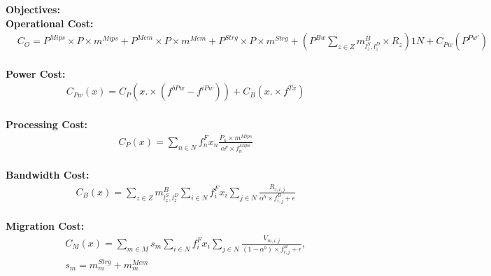 \documentclass{article}
\begin{document}
\pagebreak

\noindent\textbf{Objectives:}\\[12pt]
\noindent\textbf{Operational Cost:}\\[6pt]
\begin{equation*}
\begin{split}
	& C_O = P^{Mips} \times P \times m^{Mips} + P^{Mem} \times P \times m^{Mem} + P^{Strg}\times P\times m^{Strg} + \left(P^{Bw} \sum_{z\in Z} m^B_{l^S_z,l^D_z} \times R_z\right)1N + C_{Pw}(P^{Pw'})
\end{split}
\end{equation*}\\[6pt]

\noindent\textbf{Power Cost:}\\[6pt]
\begin{equation*}
\begin{aligned}
& C_{Pw}(x) = C_P(x.\times(f^{bPw} - f^{iPw})) + C_B(x.\times f^{Tx})
\end{aligned}
\end{equation*}\\[6pt]

\noindent\textbf{Processing Cost:}\\[6pt]
\begin{equation*}
\begin{aligned}
& C_P(x) = \sum_{n\in N} f^{F}_n x_n \frac{P_n \times m^{Mips}}{\alpha^p \times f_n^{Mips}}
\end{aligned}
\end{equation*}\\[6pt]

\noindent\textbf{Bandwidth Cost:}\\[6pt]
\begin{equation*}
\begin{split}
& C_B(x) = \sum_{z\in Z} m^B_{l^S_z,l^D_z} \sum_{i\in N} f^{F}_i x_i \sum_{j\in N} \frac{R_{z, i,j}}{\alpha^b \times f^B_{i,j} + \epsilon}
\end{split}
\end{equation*}\\[6pt]

\noindent\textbf{Migration Cost:}\\[6pt]
\begin{equation*}
\begin{split}
& C_M(x) = \sum_{m\in M} s_m \sum_{i\in N} f^{F}_i x_i \sum_{j\in N} \frac{V_{m, i,j}}{\left(1 - \alpha^b\right) \times f^B_{i,j} + \epsilon}, \\[6pt]
& s_m = m^{Strg}_{m} + m^{Mem}_{m}
\end{split}
\end{equation*}\\[6pt]
\end{document}
